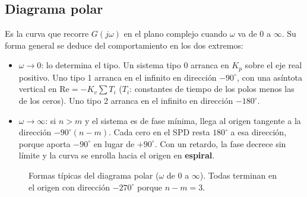 \documentclass[11pt,a4paper]{article}
\newcommand{\jw}{j\omega}
\begin{document}
\subsection{Diagrama polar}
Es la curva que recorre $G(\jw)$ en el plano complejo cuando $\omega$ va de $0$ a $\infty$. Su forma
general se deduce del comportamiento en los dos extremos:
\begin{itemize}
\item $\omega\to0$: lo determina el tipo. Un sistema tipo 0 arranca en $K_p$ sobre el eje real positivo.
      Uno tipo 1 arranca en el infinito en dirección $-90^\circ$, con una asíntota vertical en
      $\mathrm{Re}=-K_v\sum T_i$ ($T_i$: constantes de tiempo de los polos menos las de los ceros).
      Uno tipo 2 arranca en el infinito en dirección $-180^\circ$.
\item $\omega\to\infty$: si $n>m$ y el sistema es de fase mínima, llega al origen tangente a la dirección $-90^\circ(n-m)$.
      Cada cero en el SPD resta $180^\circ$ a esa dirección, porque aporta $-90^\circ$ en lugar de $+90^\circ$. Con un retardo, la fase decrece sin límite y la curva se enrolla hacia el origen en \textbf{espiral}.
\end{itemize}

\begin{figure}[ht]
\centering
{}
\caption{Formas típicas del diagrama polar ($\omega$ de 0 a $\infty$). Todas terminan en el origen con dirección $-270^\circ$ porque $n-m=3$.}
\label{fig:polar}
\end{figure}
\end{document}
